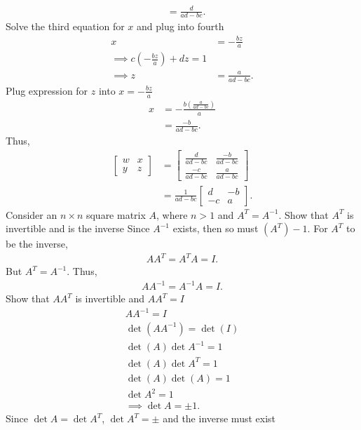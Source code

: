 \documentclass{report}
\begin{document}
\begin{itemize}
\begin{align*}
                &=\frac{d}{ad-bc}
            .\end{align*}
            Solve the third equation for $x$ and plug into fourth
            \begin{align*}
                x &=-\frac{bz}{a} \\
                \implies c\left(-\frac{bz}{a}\right) + dz = 1 \\
                \implies z&= \frac{a}{ad-bc}
            .\end{align*}
            Plug expression for $z$ into $x = -\frac{bz}{a} $
            \begin{align*}
                x &= - \frac{b\left(\frac{a}{ad-bc}\right)}{a} \\
                  &= \frac{-b}{ad-bc}
            .\end{align*}
            \bigbreak \noindent 
            Thus, 
            \begin{align*}
                \begin{bmatrix} w & x \\ y & z \end{bmatrix} &= \begin{bmatrix} \frac{d}{ad-bc} & \frac{-b}{ad-bc} \\ \frac{-c}{ad-bc} & \frac{a}{ad-bc}\end{bmatrix} \\
                                  &= \frac{1}{ad-bc} \begin{bmatrix}d & -b \\ -c & a \end{bmatrix}
            .\end{align*}
            Consider an $n\times n$ square matrix $A$, where $n> 1$ and $A^{T} = A^{-1}$. Show that $A^{T}$ is invertible and is the inverse
            \bigbreak \noindent 
            Since $A^{-1}$ exists, then so must $(A^{T})-1 $. For $A^{T}$ to be the inverse, 
            \begin{align*}
                AA^{T} = A^{T}A =I 
            .\end{align*}
            But $A^{T} = A^{-1}$. Thus,
            \begin{align*}
                AA^{-1} = A^{-1}A = I
            .\end{align*}
            Show that $AA^{T}$ is invertible and $AA^{T} =I$
            \bigbreak \noindent 
            \begin{align*}
                AA^{-1} = I \\
                \det{(AA^{-1})} = \det{(I)} \\
                \det{(A)}\det{A^{-1}} = 1\\
                \det{(A)}\det{A^{T}} = 1 \\
                \det{(A)}\det(A) = 1 \\
                \det{A}^{2} = 1 \\
                \implies \det{A} = \pm 1
            .\end{align*}
            Since $\det{A} = \det{A^{T}}$, $\det{A^{T}} = \pm $ and the inverse must exist


\end{itemize}
\end{document}

